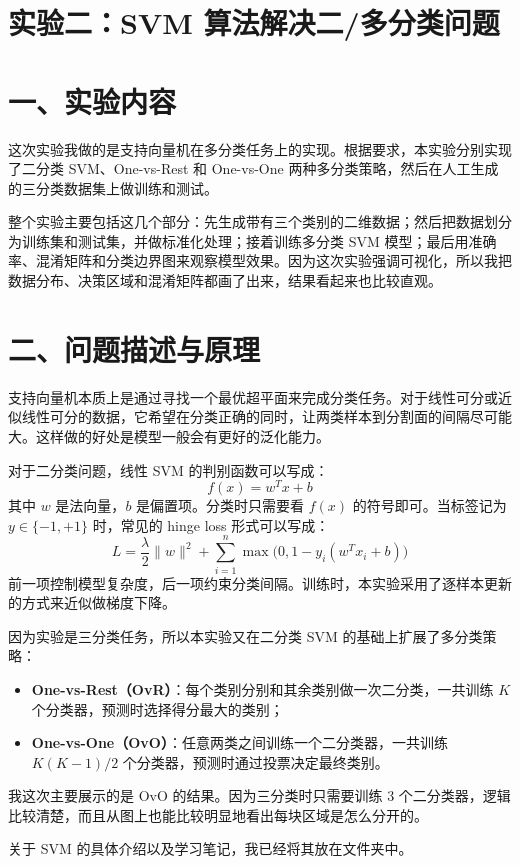 \documentclass[12pt,a4paper]{ctexart}
\begin{document}
	
	\section*{实验二：SVM 算法解决二/多分类问题}
	
	\section*{一、实验内容}
	这次实验我做的是支持向量机在多分类任务上的实现。根据要求，本实验分别实现了二分类 SVM、One-vs-Rest 和 One-vs-One 两种多分类策略，然后在人工生成的三分类数据集上做训练和测试。
	
	整个实验主要包括这几个部分：先生成带有三个类别的二维数据；然后把数据划分为训练集和测试集，并做标准化处理；接着训练多分类 SVM 模型；最后用准确率、混淆矩阵和分类边界图来观察模型效果。因为这次实验强调可视化，所以我把数据分布、决策区域和混淆矩阵都画了出来，结果看起来也比较直观。
	
	\section*{二、问题描述与原理}
	支持向量机本质上是通过寻找一个最优超平面来完成分类任务。对于线性可分或近似线性可分的数据，它希望在分类正确的同时，让两类样本到分割面的间隔尽可能大。这样做的好处是模型一般会有更好的泛化能力。
	
	对于二分类问题，线性 SVM 的判别函数可以写成：
	\[
	f(x)=w^Tx+b
	\]
	其中 $w$ 是法向量，$b$ 是偏置项。分类时只需要看 $f(x)$ 的符号即可。当标签记为 $y\in\{-1,+1\}$ 时，常见的 hinge loss 形式可以写成：
	\[
	L = \frac{\lambda}{2}\|w\|^2 + \sum_{i=1}^{n}\max\bigl(0,1-y_i(w^Tx_i+b)\bigr)
	\]
	前一项控制模型复杂度，后一项约束分类间隔。训练时，本实验采用了逐样本更新的方式来近似做梯度下降。
	
	因为实验是三分类任务，所以本实验又在二分类 SVM 的基础上扩展了多分类策略：
	\begin{itemize}
		\item[(1)] \textbf{One-vs-Rest（OvR）}：每个类别分别和其余类别做一次二分类，一共训练 $K$ 个分类器，预测时选择得分最大的类别；
		\item[(2)] \textbf{One-vs-One（OvO）}：任意两类之间训练一个二分类器，一共训练 $K(K-1)/2$ 个分类器，预测时通过投票决定最终类别。
	\end{itemize}
	
	我这次主要展示的是 OvO 的结果。因为三分类时只需要训练 3 个二分类器，逻辑比较清楚，而且从图上也能比较明显地看出每块区域是怎么分开的。
	
	关于 SVM 的具体介绍以及学习笔记，我已经将其放在文件夹中。
	
\end{document}
